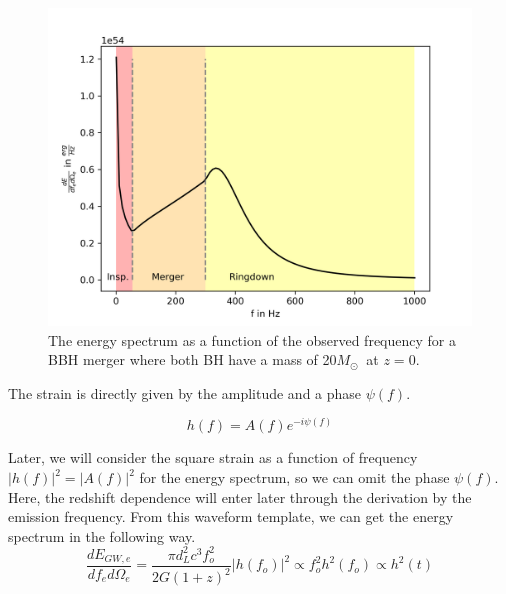 \begin{figure}
    \centering
    \includegraphics[width=\linewidth]{Images/dE_df_of_f.png}
    \caption{The energy spectrum as a function of the observed frequency for a BBH merger where both BH have a mass of 20$M_\odot\ $ at $z=0$. }
    \label{dE_df_f}
\end{figure} 

The strain is directly given by the amplitude and a phase $\psi(f)$.


\begin{equation}
    h(f)=A(f)e^{-i\psi(f)}
\end{equation}

Later, we will consider the square strain as a function of frequency $|h(f)|^2=|A(f)|^2$ for the energy spectrum, so we can omit the phase $\psi(f)$. Here, the redshift dependence will enter later through the derivation by the emission frequency. From this waveform template, we can get the energy spectrum in the following way.
\begin{equation}
    \frac{dE_{GW,e}}{df_e d\Omega_e} = \frac{\pi d_L^2 c^3f_o^2}{2G(1+z)^2} | h(f_o)| ^2 \propto f_o^2h^2(f_o) \propto h^2(t)
\end{equation}


